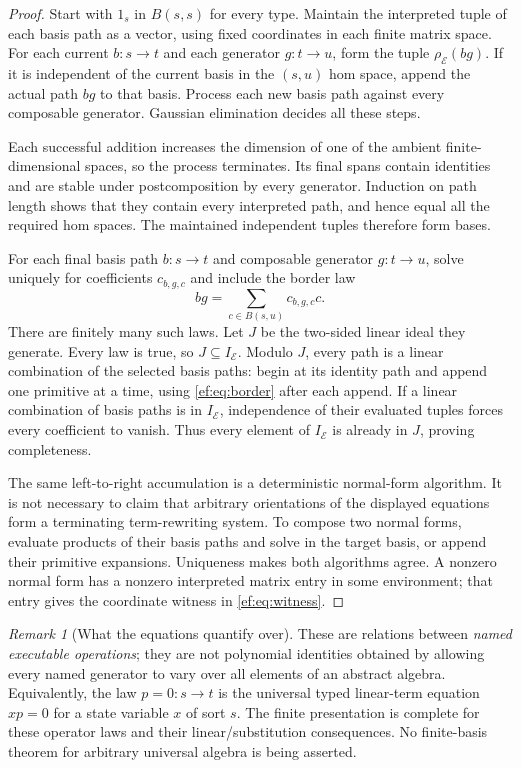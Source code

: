\documentclass[11pt]{article}
\theoremstyle{definition}
\theoremstyle{remark}\newtheorem{remark}[theorem]{Remark}
\begin{document}
\begin{proof}
Start with $1_s$ in $B(s,s)$ for every type. Maintain the interpreted tuple
of each basis path as a vector, using fixed coordinates in each finite
matrix space. For each current $b:s\to t$ and each generator $g:t\to u$,
form the tuple $\rho_{\mathcal E}(bg)$. If it is independent of the
current basis in the $(s,u)$ hom space, append the actual path $bg$ to
that basis. Process each new basis path against every composable
generator. Gaussian elimination decides all these steps.

Each successful addition increases the dimension of one of the ambient
finite-dimensional spaces, so the process terminates. Its final spans
contain identities and are stable under postcomposition by every
generator. Induction on path length shows that they contain every
interpreted path, and hence equal all the required hom spaces.
The maintained independent tuples therefore form bases.

For each final basis path $b:s\to t$ and composable generator $g:t\to u$,
solve uniquely for coefficients $c_{b,g,c}$ and include the border law
\begin{equation}\label{ef:eq:border}
       bg=\sum_{c\in B(s,u)}c_{b,g,c}c.
\end{equation}
There are finitely many such laws. Let $J$ be the two-sided linear ideal
they generate. Every law is true, so $J\subseteq I_{\mathcal E}$.
Modulo $J$, every path is a linear combination of the selected basis
paths: begin at its identity path and append one primitive at a time,
using \eqref{ef:eq:border} after each append. If a linear combination of
basis paths is in $I_{\mathcal E}$, independence of their evaluated tuples
forces every coefficient to vanish. Thus every element of
$I_{\mathcal E}$ is already in $J$, proving completeness.

The same left-to-right accumulation is a deterministic normal-form
algorithm. It is not necessary to claim that arbitrary orientations of
the displayed equations form a terminating term-rewriting system.
To compose two normal forms, evaluate products of their basis paths and
solve in the target basis, or append their primitive expansions.
Uniqueness makes both algorithms agree. A nonzero normal form has a
nonzero interpreted matrix entry in some environment; that entry gives
the coordinate witness in \eqref{ef:eq:witness}.
\end{proof}

\begin{remark}[What the equations quantify over]
These are relations between \emph{named executable operations}; they
are not polynomial identities obtained by allowing every named generator
to vary over all elements of an abstract algebra. Equivalently, the law
$p=0:s\to t$ is the universal typed linear-term equation $xp=0$ for a
state variable $x$ of sort $s$. The finite presentation is complete for
these operator laws and their linear/substitution consequences. No
finite-basis theorem for arbitrary universal algebra is being asserted.
\end{remark}
\end{document}
